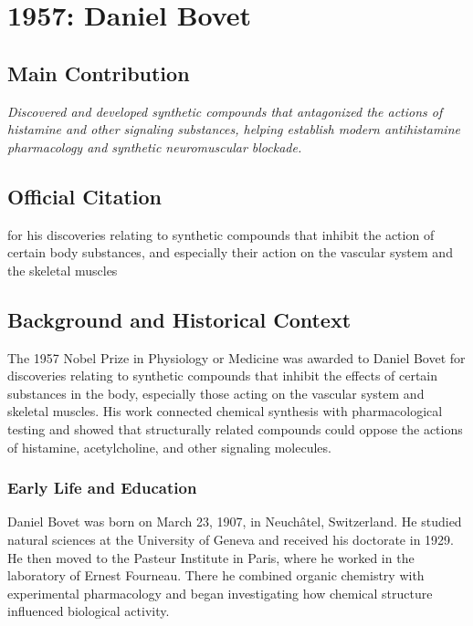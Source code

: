 \chapter[1957 --- Bovet]{1957: Daniel Bovet}
\label{ch:1957_danielbovet}

\section*{Main Contribution}

\textit{Discovered and developed synthetic compounds that antagonized the actions of histamine and other signaling substances, helping establish modern antihistamine pharmacology and synthetic neuromuscular blockade.}\cite{nobel-1957,lecture-1957}

\section{Official Citation}

for his discoveries relating to synthetic compounds that inhibit the action of certain body substances, and especially their action on the vascular system and the skeletal muscles

\section{Background and Historical Context}

The 1957 Nobel Prize in Physiology or Medicine was awarded to Daniel Bovet for discoveries relating to synthetic compounds that inhibit the effects of certain substances in the body, especially those acting on the vascular system and skeletal muscles. His work connected chemical synthesis with pharmacological testing and showed that structurally related compounds could oppose the actions of histamine, acetylcholine, and other signaling molecules.

\subsection{Early Life and Education}

Daniel Bovet was born on March 23, 1907, in Neuch\^atel, Switzerland. He studied natural sciences at the University of Geneva and received his doctorate in 1929. He then moved to the Pasteur Institute in Paris, where he worked in the laboratory of Ernest Fourneau. There he combined organic chemistry with experimental pharmacology and began investigating how chemical structure influenced biological activity.

